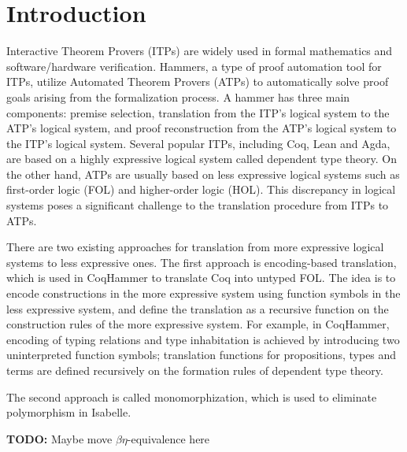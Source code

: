 \section{Introduction}

  Interactive Theorem Provers (ITPs) are widely used in formal mathematics and
  software/hardware verification. Hammers, a type of proof automation tool for
  ITPs, utilize Automated Theorem Provers (ATPs) to automatically solve proof goals
  arising from the formalization process. A hammer has three main components:
  premise selection, translation from the ITP's logical system to the ATP's
  logical system, and proof reconstruction from the ATP's logical system to
  the ITP's logical system. Several popular ITPs, including Coq, Lean and Agda,
  are based on a highly expressive logical system called dependent type theory.
  On the other hand, ATPs are usually based on less expressive logical systems such
  as first-order logic (FOL) and higher-order logic (HOL). This discrepancy in
  logical systems poses a significant challenge to the translation procedure from
  ITPs to ATPs.

  \noindent There are two existing approaches for translation from more expressive
  logical systems to less expressive ones. The first approach is encoding-based translation,
  which is used in CoqHammer to translate Coq into untyped FOL. The idea is to encode
  constructions in the more expressive system using function symbols in the less
  expressive system, and define the translation as a recursive function on the construction
  rules of the more expressive system. For example, in CoqHammer, encoding of typing relations
  and type inhabitation is achieved by introducing two uninterpreted function symbols;
  translation functions for propositions, types and terms are defined recursively on
  the formation rules of dependent type theory. 

  \noindent The second approach is called monomorphization, which is used to eliminate polymorphism
  in Isabelle.

  \noindent \textbf{TODO:} Maybe move $\beta\eta$-equivalence here